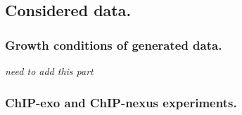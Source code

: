 \documentclass{bmcart}\usepackage[]{graphicx}\usepackage[]{color}
\newcommand{\sig}{\sigma^{70}}
\begin{document}
\subsection*{Considered data.}




\subsubsection*{Growth conditions of generated data.}

\color{red}
\emph{need to add this part}
\color{black}

\subsubsection{ChIP-exo and ChIP-nexus experiments.}


\end{document}

